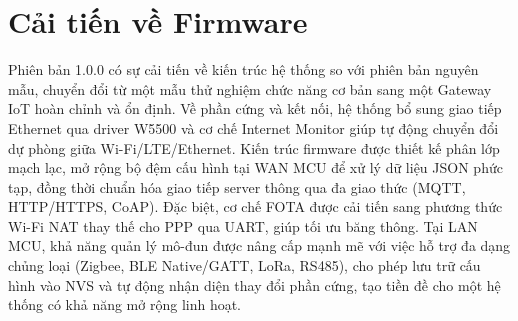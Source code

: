\section{Cải tiến về Firmware}
    Phiên bản 1.0.0 có sự cải tiến về kiến trúc hệ thống so với phiên bản nguyên mẫu, chuyển đổi từ một mẫu thử nghiệm chức năng cơ bản sang một Gateway IoT hoàn chỉnh và ổn định. Về phần cứng và kết nối, hệ thống bổ sung giao tiếp Ethernet qua driver W5500 và cơ chế Internet Monitor giúp tự động chuyển đổi dự phòng giữa Wi-Fi/LTE/Ethernet. Kiến trúc firmware được thiết kế phân lớp mạch lạc, mở rộng bộ đệm cấu hình tại WAN MCU để xử lý dữ liệu JSON phức tạp, đồng thời chuẩn hóa giao tiếp server thông qua đa giao thức (MQTT, HTTP/HTTPS, CoAP). Đặc biệt, cơ chế FOTA được cải tiến sang phương thức Wi-Fi NAT thay thế cho PPP qua UART, giúp tối ưu băng thông. Tại LAN MCU, khả năng quản lý mô-đun được nâng cấp mạnh mẽ với việc hỗ trợ đa dạng chủng loại (Zigbee, BLE Native/GATT, LoRa, RS485), cho phép lưu trữ cấu hình vào NVS và tự động nhận diện thay đổi phần cứng, tạo tiền đề cho một hệ thống có khả năng mở rộng linh hoạt.

